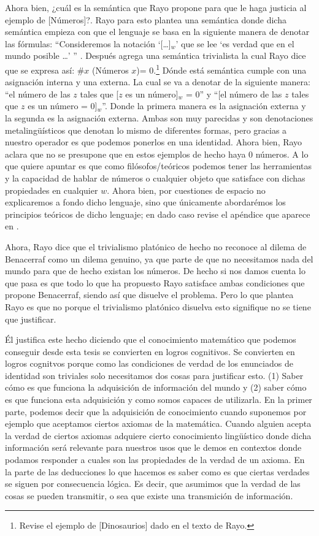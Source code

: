 \documentclass[]{article}
\begin{document}
Ahora bien, ¿cuál es la semántica que Rayo propone para 
que le haga justicia al ejemplo de [Números]?. Rayo 
para esto plantea una semántica donde dicha semántica 
empieza con que el lenguaje se basa en la siguiente manera de 
denotar las fórmulas: ``Consideremos la notación `[\dots]$_w$'
que se lee `es verdad que en el mundo posible \dots' ''
\cite{rayo2013}. Después agrega una semántica trivialista 
la cual Rayo dice que se expresa así: \#$x$ (Números $x$)= 0.\footnote{
Revise el ejemplo de [Dinosaurios] dado en el texto de Rayo.
} D\'onde est\'a semántica cumple con una asignación interna y una externa.
La cual se va a denotar de la siguiente manera: ``el número de 
las $z$ tales que [$z$ es un número]$_w$ = 0'' y ``[el número de 
las $z$ tales que $z$ es un número = 0]$_w$''.
Donde la primera manera es la asignación externa y la segunda 
es la asignación externa. Ambas son muy parecidas y son 
denotaciones metalingü\'isticos que denotan lo mismo de diferentes 
formas, pero gracias a nuestro operador es que podemos 
ponerlos en una identidad. Ahora bien, Rayo aclara que no se 
presupone que en estos ejemplos de hecho haya 0 números. 
A lo que quiere apuntar es que como filósofos/teóricos 
podemos tener las herramientas y la capacidad de hablar de números 
o cualquier objeto que satisface con dichas propiedades en cualquier
$w$. Ahora bien, por cuestiones de espacio no explicaremos
a fondo dicho lenguaje, sino que \'unicamente abordarémos
los principios teóricos de dicho lenguaje; en 
dado caso revise el apéndice que aparece en \cite{rayo2013}.

Ahora, Rayo dice que el trivialismo plat\'onico de hecho no 
reconoce al dilema de Benacerraf como un dilema genuino, ya 
que parte de que no necesitamos nada del mundo para que de hecho 
existan los números. De hecho si nos damos cuenta lo que pasa 
es que todo lo que ha propuesto Rayo satisface ambas condiciones 
que propone Benacerraf, siendo así que disuelve el problema. 
Pero lo que plantea Rayo es que no porque el trivialismo 
plat\'onico disuelva esto signifique no se tiene que justificar. 

Él justifica este hecho diciendo que el conocimiento matemático 
que podemos conseguir desde esta tesis se convierten en logros 
cognitivos. Se convierten en logros cognitvos porque como 
las condiciones de verdad de los enunciados de identidad son 
triviales solo necesitamos dos cosas para justificar esto. 
(1) Saber c\'omo es que funciona la adquisición de información 
del mundo y (2) saber c\'omo es que funciona esta adquisición 
y como somos capaces de utilizarla. En la primer parte, 
podemos decir que la adquisición de conocimiento
cuando suponemos por ejemplo que aceptamos ciertos 
axiomas de la matemática. Cuando alguien acepta 
la verdad de ciertos axiomas adquiere cierto conocimiento
lingüístico donde dicha información será relevante 
para nuestros usos que le demos en contextos donde 
podamos responder a cuales son las propiedades 
de la verdad de un axioma. En la parte de las 
deducciones lo que hacemos es saber 
como es que ciertas verdades se siguen por consecuencia 
lógica. Es decir, que asumimos que la verdad de las 
cosas se pueden transmitir, o sea que existe una 
transmición de información.     
\end{document}
